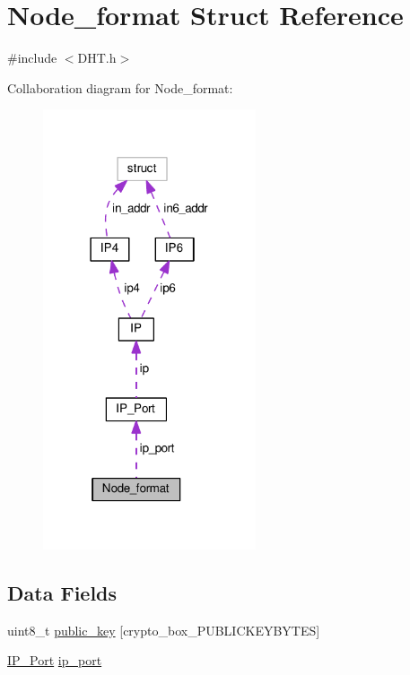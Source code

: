 \hypertarget{struct_node__format}{\section{Node\+\_\+format Struct Reference}
\label{struct_node__format}
}


{\ttfamily \#include $<$D\+H\+T.\+h$>$}



Collaboration diagram for Node\+\_\+format\+:
\nopagebreak
\begin{figure}[H]
\begin{center}
\leavevmode
\includegraphics[width=178pt]{d0/df8/struct_node__format__coll__graph}
\end{center}
\end{figure}
\subsection*{Data Fields}
\begin{DoxyCompactItemize}
\item 
uint8\+\_\+t \hyperlink{struct_node__format_aaa806bb1136fb3d4b5d8d8970b596ff7}{public\+\_\+key} \mbox{[}crypto\+\_\+box\+\_\+\+P\+U\+B\+L\+I\+C\+K\+E\+Y\+B\+Y\+T\+E\+S\mbox{]}
\item 
\hyperlink{struct_i_p___port}{I\+P\+\_\+\+Port} \hyperlink{struct_node__format_a86e2a5a56c0dd22df6e8b8a10e40f9e4}{ip\+\_\+port}
\end{DoxyCompactItemize}


